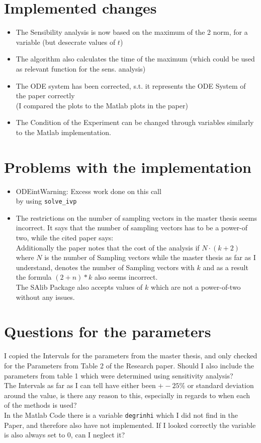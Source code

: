 \documentclass{article}
\begin{document}
\section*{Implemented changes}
\begin{itemize}
  \item The Sensibility analysis is now based on the maximum of the 2 norm, for a variable (but desecrate values of \(t\))
  \item The algorithm also calculates the time of the maximum (which could be used as relevant function for the sens.
    analysis)
  \item The ODE system has been corrected, s.t. it represents the ODE System of the paper correctly\\
        (I compared the plots to the Matlab plots in the paper)
  \item The Condition of the Experiment can be changed through variables similarly to the Matlab implementation.
\end{itemize}
\section*{Problems with the implementation}
\begin{itemize}
  \item ODEintWarning: Excess work done on this call \\
     by using \texttt{solve\_ivp}
  \item The restrictions on the number of sampling vectors in the master thesis seems incorrect.
    It says that the number of sampling vectors has to be a power-of two, while the cited paper says:
     \\
    Additionally the paper notes that the cost of the analysis if \(N \cdot (k +2)\) where \(N\) is the number of
    Sampling vectors while the master thesis as far as I understand, denotes the number of Sampling vectors with \(k\) and as
    a result the formula \((2+n) * k\)  also seems incorrect.\\
    The SAlib Package also accepts values of \(k\) which are not a power-of-two without any issues.
\end{itemize}
\section*{Questions for the parameters}
I copied the Intervals for the parameters from the master thesis, and only checked for the Parameters from Table 2 of the
Research paper. Should I also include the parameters from table 1 which were determined using sensitivity analysis? \\

The Intervals as far as I can tell have either been \(+- 25\%\) or standard deviation around the value, is there any reason
to this, especially in regards to when each of the methods is used?\\

In the Matlab Code there is a variable \texttt{degrinhi} which I did not find in the Paper, and therefore also have not
implemented. If I looked correctly the variable is also always set to 0, can I neglect it? \\
\end{document}
